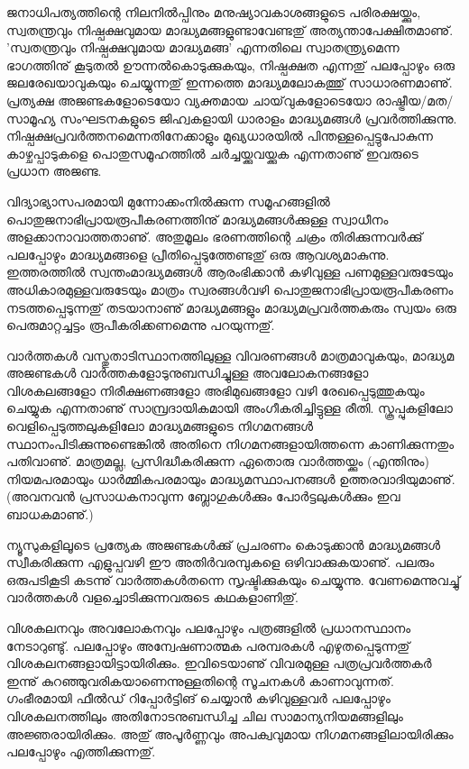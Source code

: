 ﻿
\vskip 2pt

ജനാധിപത്യത്തിന്റെ നിലനില്‍പ്പിനും മനുഷ്യാവകാശങ്ങളുടെ പരിരക്ഷയ്ക്കും, സ്വതന്ത്രവും നിഷ്പക്ഷവുമായ 
മാദ്ധ്യമങ്ങളുണ്ടാവേണ്ടതു് അത്യന്താപേക്ഷിതമാണു്. 'സ്വതന്ത്രവും നിഷ്പക്ഷവുമായ മാദ്ധ്യമങ്ങ' എന്നതിലെ 
സ്വാതന്ത്ര്യമെന്ന ഭാഗത്തിനു് കൂടുതല്‍ ഊന്നല്‍കൊടുക്കുകയും, നിഷ്പക്ഷത എന്നതു് പലപ്പോഴും ഒരു ജലരേഖയാവുകയും 
ചെയ്യുന്നതു് ഇന്നത്തെ മാദ്ധ്യമലോകത്തു് സാധാരണമാണു്. പ്രത്യക്ഷ അജണ്ടകളോടെയോ വ്യക്തമായ 
ചായ്‌വുകളോടെയോ രാഷ്ട്രീയ/മത/സാമൂഹ്യ സംഘടനകളുടെ ജിഹ്വകളായി ധാരാളം മാദ്ധ്യമങ്ങള്‍ പ്രവര്‍ത്തിക്കുന്നു. 
നിഷ്പക്ഷപ്രവര്‍ത്തനമെന്നതിനേക്കാളും മുഖ്യധാരയില്‍ പിന്തള്ളപ്പെട്ടുപോകുന്ന കാഴ്ചപ്പാടുകളെ പൊതുസമൂഹത്തില്‍ 
ചര്‍ച്ചയ്ക്കുവയ്ക്കുക എന്നതാണു് ഇവരുടെ പ്രധാന അജണ്ട.

വിദ്യാഭ്യാസപരമായി മുന്നോക്കംനില്‍ക്കുന്ന സമൂഹങ്ങളില്‍ പൊതുജനാഭിപ്രായരൂപീകരണത്തിനു് മാദ്ധ്യമങ്ങള്‍ക്കുള്ള 
സ്വാധീനം അളക്കാനാവാത്തതാണു്. അതുമൂലം ഭരണത്തിന്റെ ചക്രം തിരിക്കുന്നവര്‍ക്കു് പലപ്പോഴും മാദ്ധ്യമങ്ങളെ 
പ്രീതിപ്പെടുത്തേണ്ടതു് ഒരു ആവശ്യമാകുന്നു. ഇത്തരത്തില്‍ സ്വന്തംമാദ്ധ്യമങ്ങള്‍ ആരംഭിക്കാന്‍ കഴിവുള്ള പണമുള്ളവരുടേയും 
അധികാരമുള്ളവരുടേയും മാത്രം സ്വരങ്ങള്‍വഴി പൊതുജനാഭിപ്രായരൂപീകരണം നടത്തപ്പെടുന്നതു് തടയാനാണു് 
മാദ്ധ്യമങ്ങളും മാദ്ധ്യമപ്രവര്‍ത്തകരും സ്വയം ഒരു പെരുമാറ്റച്ചട്ടം രൂപീകരിക്കണമെന്നു പറയുന്നതു്.

വാര്‍ത്തകള്‍ വസ്തുതാടിസ്ഥാനത്തിലുള്ള വിവരണങ്ങള്‍ മാത്രമാവുകയും, മാദ്ധ്യമ അജണ്ടകള്‍ 
വാര്‍ത്തകളോടുനുബന്ധിച്ചുള്ള അവലോകനങ്ങളോ വിശകലങ്ങളോ നിരീക്ഷണങ്ങളോ അഭിമുഖങ്ങളോ വഴി 
രേഖപ്പെടുത്തുകയും ചെയ്യുക എന്നതാണു് സാമ്പ്രദായികമായി അംഗീകരിച്ചിട്ടുള്ള രീതി. സ്കൂപ്പുകളിലോ 
വെളിപ്പെടുത്തലുകളിലോ മാദ്ധ്യമങ്ങളുടെ നിഗമനങ്ങള്‍ സ്ഥാനംപിടിക്കുന്നുണ്ടെങ്കില്‍ അതിനെ നിഗമനങ്ങളായിത്തന്നെ 
കാണിക്കുന്നതും പതിവാണു്. മാത്രമല്ല, പ്രസിദ്ധീകരിക്കുന്ന ഏതൊരു വാര്‍ത്തയ്ക്കും (എന്തിനും) നിയമപരമായും 
ധാര്‍മ്മികപരമായും മാദ്ധ്യമസ്ഥാപനങ്ങള്‍ ഉത്തരവാദിയുമാണു്. (അവനവന്‍ പ്രസാധകനാവുന്ന ബ്ലോഗുകള്‍ക്കും 
പോര്‍ട്ടലുകള്‍ക്കും ഇവ ബാധകമാണു്.)

ന്യൂസുകളിലൂടെ പ്രത്യേക അജണ്ടകള്‍ക്കു് പ്രചരണം കൊടുക്കാന്‍ മാദ്ധ്യമങ്ങള്‍ സ്വീകരിക്കുന്ന എളുപ്പവഴി ഈ 
അതിര്‍വരമ്പുകളെ ഒഴിവാക്കുകയാണു്. പലരും ഒരുപടികൂടി കടന്നു് വാര്‍ത്തകള്‍തന്നെ സൃഷ്ടിക്കുകയും ചെയ്യുന്നു. 
വേണമെന്നുവച്ചു് വാര്‍ത്തകള്‍ വളച്ചൊടിക്കുന്നവരുടെ കഥകളാണിതു്.

വിശകലനവും അവലോകനവും പലപ്പോഴും പത്രങ്ങളില്‍ പ്രധാനസ്ഥാനം നേടാറുണ്ടു്. പലപ്പോഴും അന്വേഷണാത്മക 
പരമ്പരകള്‍ എഴുതപ്പെടുന്നതു് വിശകലനങ്ങളായിട്ടായിരിക്കും. ഇവിടെയാണു് വിവരമുള്ള പത്രപ്രവര്‍ത്തകര്‍ ഇന്നു് 
കുറഞ്ഞുവരികയാണെന്നുള്ളതിന്റെ സൂചനകള്‍ കാണാവുന്നത്. ഗംഭീരമായി ഫീല്‍ഡ് റിപ്പോര്‍ട്ടിങ് ചെയ്യാന്‍ 
കഴിവുള്ളവര്‍ പലപ്പോഴും വിശകലനത്തിലും അതിനോടനുബന്ധിച്ച ചില സാമാന്യനിയമങ്ങളിലും അജ്ഞരായിരിക്കും. 
അതു് അപൂര്‍ണ്ണവും അപക്വവുമായ നിഗമനങ്ങളിലായിരിക്കും പലപ്പോഴും എത്തിക്കുന്നതു്.

